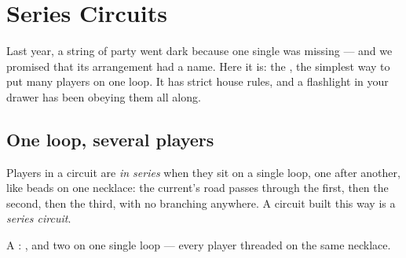 \chapter{Series Circuits}\label{ch:g4:series-circuits}

Last year, a string of party  went dark because one single
 was missing --- and we promised that its arrangement had a
name. Here it is: the , the simplest way to put many
players on one loop. It has strict house rules, and a flashlight in
your drawer has been obeying them all along.

\section{One loop, several players}

\begin{definition}[In series]\label{def:g4:series-circuits:series}
Players in a circuit are \emph{in series} when
they sit on a single loop, one after another, like beads on one
necklace: the current's road passes through the first, then the
second, then the third, with no branching anywhere. A circuit built
this way is a \emph{series circuit}.
\end{definition}

\begin{omfigure}

{\small A : ,  and two  on one
single loop --- every player threaded on the same necklace.}
\end{omfigure}

